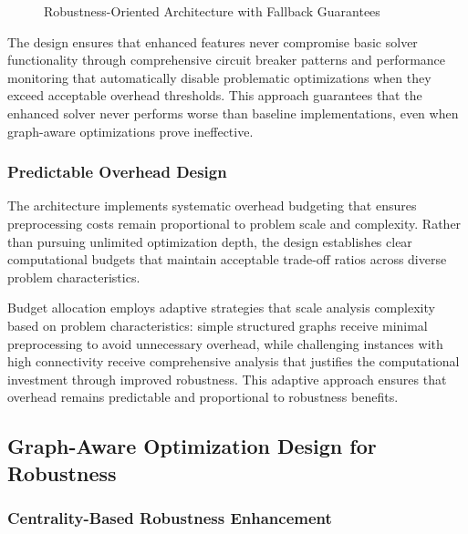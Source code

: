 \begin{figure}[htbp]
\caption{Robustness-Oriented Architecture with Fallback Guarantees}
\label{fig:robust_architecture}
\end{figure}

The design ensures that enhanced features never compromise basic solver functionality through comprehensive circuit breaker patterns and performance monitoring that automatically disable problematic optimizations when they exceed acceptable overhead thresholds. This approach guarantees that the enhanced solver never performs worse than baseline implementations, even when graph-aware optimizations prove ineffective.

\subsubsection{Predictable Overhead Design}

The architecture implements systematic overhead budgeting that ensures preprocessing costs remain proportional to problem scale and complexity. Rather than pursuing unlimited optimization depth, the design establishes clear computational budgets that maintain acceptable trade-off ratios across diverse problem characteristics.

Budget allocation employs adaptive strategies that scale analysis complexity based on problem characteristics: simple structured graphs receive minimal preprocessing to avoid unnecessary overhead, while challenging instances with high connectivity receive comprehensive analysis that justifies the computational investment through improved robustness. This adaptive approach ensures that overhead remains predictable and proportional to robustness benefits.

\subsection{Graph-Aware Optimization Design for Robustness}

\subsubsection{Centrality-Based Robustness Enhancement}

